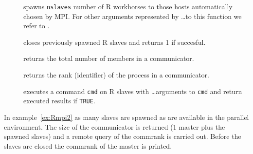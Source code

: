 \begin{description}

\item[] spawns \texttt{nslaves} number of R
  workhorses to those hosts automatically chosen by MPI. For other
  arguments represented by \ldots to this function we refer to
  \cite{yu06Rmpi}.
\item[] closes
  previously spawned R slaves and returns 1 if succesful.
\item[] returns the total number of members in
  a communicator.
\item[] returns the rank (identifier) of the
  process in a communicator.
\item[]
  executes a command \texttt{cmd} on R slaves with \ldots arguments to
  \texttt{cmd} and return executed results if \texttt{TRUE}.
\end{description}

In example~\ref{ex:Rmpi2} as many slaves are spawned as are available
in the parallel environment. The size of the communicator is returned
(1 master plus the spawned slaves) and a remote query of the commrank
is carried out. Before the slaves are closed the commrank of the
master is printed.

